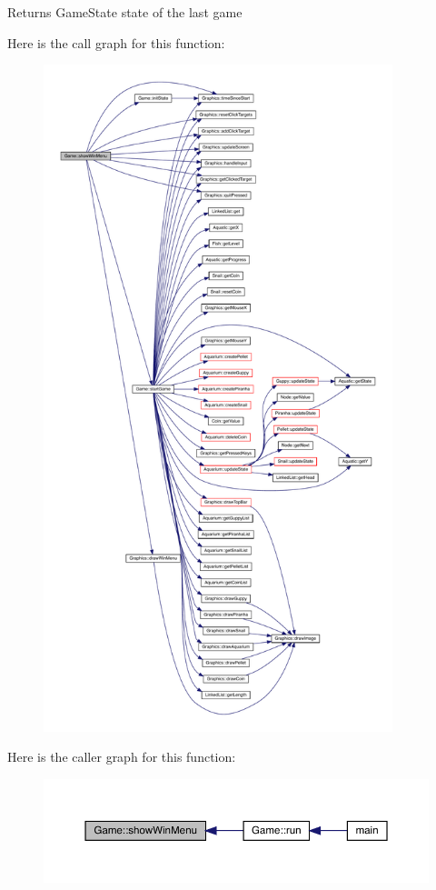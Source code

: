 \begin{DoxyReturn}{Returns}
Game\+State state of the last game 
\end{DoxyReturn}
Here is the call graph for this function\+:\nopagebreak
\begin{figure}[H]
\begin{center}
\leavevmode
\includegraphics[height=550pt]{class_game_a02d7239b140618836f409b6926070f88_cgraph}
\end{center}
\end{figure}
Here is the caller graph for this function\+:
\nopagebreak
\begin{figure}[H]
\begin{center}
\leavevmode
\includegraphics[width=350pt]{class_game_a02d7239b140618836f409b6926070f88_icgraph}
\end{center}
\end{figure}
\mbox{\label{class_game_afcca871ec55fbe14b2179bcb914d5421}} 

